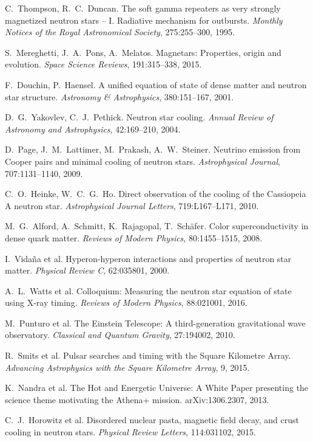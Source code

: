 \documentclass[12pt,a4paper]{article}
\theoremstyle{definition}
\theoremstyle{remark}
\begin{document}
\begin{thebibliography}{99}
C.~Thompson, R.~C.~Duncan.
\newblock The soft gamma repeaters as very strongly magnetized neutron stars -- I. Radiative mechanism for outbursts.
\newblock \emph{Monthly Notices of the Royal Astronomical Society}, 275:255--300, 1995.

S.~Mereghetti, J.~A.~Pons, A.~Melatos.
\newblock Magnetars: Properties, origin and evolution.
\newblock \emph{Space Science Reviews}, 191:315--338, 2015.

F.~Douchin, P.~Haensel.
\newblock A unified equation of state of dense matter and neutron star structure.
\newblock \emph{Astronomy \& Astrophysics}, 380:151--167, 2001.

D.~G.~Yakovlev, C.~J.~Pethick.
\newblock Neutron star cooling.
\newblock \emph{Annual Review of Astronomy and Astrophysics}, 42:169--210, 2004.

D.~Page, J.~M.~Lattimer, M.~Prakash, A.~W.~Steiner.
\newblock Neutrino emission from Cooper pairs and minimal cooling of neutron stars.
\newblock \emph{Astrophysical Journal}, 707:1131--1140, 2009.

C.~O.~Heinke, W.~C.~G.~Ho.
\newblock Direct observation of the cooling of the Cassiopeia A neutron star.
\newblock \emph{Astrophysical Journal Letters}, 719:L167--L171, 2010.

M.~G.~Alford, A.~Schmitt, K.~Rajagopal, T.~Schäfer.
\newblock Color superconductivity in dense quark matter.
\newblock \emph{Reviews of Modern Physics}, 80:1455--1515, 2008.

I.~Vidaña et al.
\newblock Hyperon-hyperon interactions and properties of neutron star matter.
\newblock \emph{Physical Review C}, 62:035801, 2000.

A.~L.~Watts et al.
\newblock Colloquium: Measuring the neutron star equation of state using X-ray timing.
\newblock \emph{Reviews of Modern Physics}, 88:021001, 2016.

M.~Punturo et al.
\newblock The Einstein Telescope: A third-generation gravitational wave observatory.
\newblock \emph{Classical and Quantum Gravity}, 27:194002, 2010.

R.~Smits et al.
\newblock Pulsar searches and timing with the Square Kilometre Array.
\newblock \emph{Advancing Astrophysics with the Square Kilometre Array}, 9, 2015.

K.~Nandra et al.
\newblock The Hot and Energetic Universe: A White Paper presenting the science theme motivating the Athena+ mission.
\newblock arXiv:1306.2307, 2013.

C.~J.~Horowitz et al.
\newblock Disordered nuclear pasta, magnetic field decay, and crust cooling in neutron stars.
\newblock \emph{Physical Review Letters}, 114:031102, 2015.

\end{thebibliography}
\end{document}

